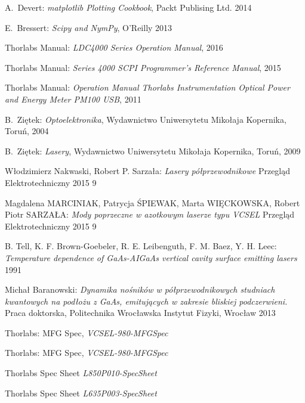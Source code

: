 \begin{thebibliography}{99}
  A.~Devert:
\emph{matplotlib Plotting Cookbook},
Packt Publising Ltd. 2014

 E.~Bressert:
\emph{Scipy and NymPy},
O'Reilly 2013

 Thorlabs Manual:
\emph{LDC4000 Series Operation Manual},
2016

 Thorlabs Manual:
\emph{Series 4000 SCPI Programmer's Reference Manual},
2015

 Thorlabs Manual:
\emph{Operation Manual
Thorlabs Instrumentation Optical Power and Energy Meter PM100 USB},
2011

  B.~Ziętek:
\emph{Optoelektronika},
Wydawnictwo Uniwersytetu Mikołaja Kopernika, Toruń, 2004

  B.~Ziętek:
\emph{Lasery},
Wydawnictwo Uniwersytetu Mikołaja Kopernika, Toruń, 2009

 Włodzimierz Nakwaski, Robert P. Sarzała:
\emph{Lasery półprzewodnikowe}
 Przegląd Elektrotechniczny 2015 9

 Magdalena MARCINIAK, Patrycja
ŚPIEWAK, Marta WIĘCKOWSKA, Robert Piotr SARZAŁA:
\emph{Mody poprzeczne w azotkowym laserze typu VCSEL}
 Przegląd Elektrotechniczny 2015 9

 B. Tell, K. F. Brown-Goebeler, R. E. Leibenguth, F. M.  Baez, Y. H. Leec:
\emph{Temperature dependence of GaAs-AIGaAs vertical cavity surface emitting lasers }
1991

 Michał Baranowski:
\emph{Dynamika nośników w półprzewodnikowych
studniach kwantowych na podłożu z GaAs, emitujących w zakresie bliskiej podczerwieni.}
Praca doktorska, Politechnika Wrocławska
Instytut Fizyki, Wrocław 2013

 Thorlabs:
MFG Spec,
\emph{VCSEL-980-MFGSpec}

 Thorlabs:
MFG Spec,
\emph{VCSEL-980-MFGSpec}

 Thorlabs
Spec Sheet
\emph{L850P010-SpecSheet}

 Thorlabs
Spec Sheet
\emph{L635P003-SpecSheet}
\end{thebibliography}
